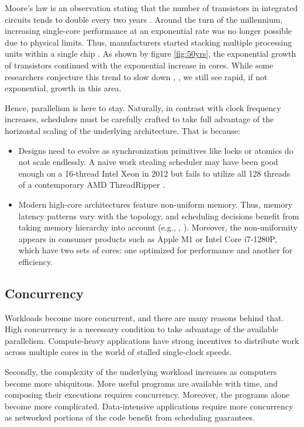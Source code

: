\documentclass[12pt,a4paper,twoside]{report}
\begin{document}
Moore's law is an observation stating that the number of transistors in integrated circuits tends to double every two years \cite{Moore2006}. Around the turn of the millennium, increasing single-core performance at an exponential rate was no longer possible due to physical limits. Thus, manufacturers started stacking multiple processing units within a single chip \cite{Geer2005}. As shown by figure \ref{fig:50yrs}, the exponential growth of transistors continued with the exponential increase in cores. While some researchers conjecture this trend to slow down \cite{6307773}, \cite{mooremulti}, we still see rapid, if not exponential, growth in this area.

Hence, parallelism is here to stay. Naturally, in contrast with clock frequency increases, schedulers must be carefully crafted to take full advantage of the horizontal scaling of the underlying architecture. That is because:
\begin{itemize}
    \item Designs need to evolve as synchronization primitives like locks or atomics do not scale endlessly. A naive work stealing scheduler may have been good enough on a 16-thread Intel Xeon in 2012 but fails to utilize all 128 threads of a contemporary AMD ThreadRipper \cite{Castello2016}. 
    \item Modern high-core architectures feature non-uniform memory. Thus, memory latency patterns vary with the topology, and scheduling decisions benefit from taking memory hierarchy into account (e.g., \cite{Drebes2016}, \cite{faverge:inria-00416502}). Moreover, the non-uniformity appears in consumer products such as Apple M1 or Intel Core i7-1280P, which have two sets of cores: one optimized for performance and another for efficiency.
\end{itemize}

\subsection{Concurrency}
\label{section:intr_software_conc}
Workloads become more concurrent, and there are many reasons behind that. High concurrency is a necessary condition to take advantage of the available parallelism. Compute-heavy applications have strong incentives to distribute work across multiple cores in the world of stalled single-clock speeds. 

Secondly, the complexity of the underlying workload increases as computers become more ubiquitous. More useful programs are available with time, and composing their executions requires concurrency. Moreover, the programs alone become more complicated. Data-intensive applications \cite{Kleppmann2017-en} require more concurrency as networked portions of the code benefit from scheduling guarantees. 
\end{document}

